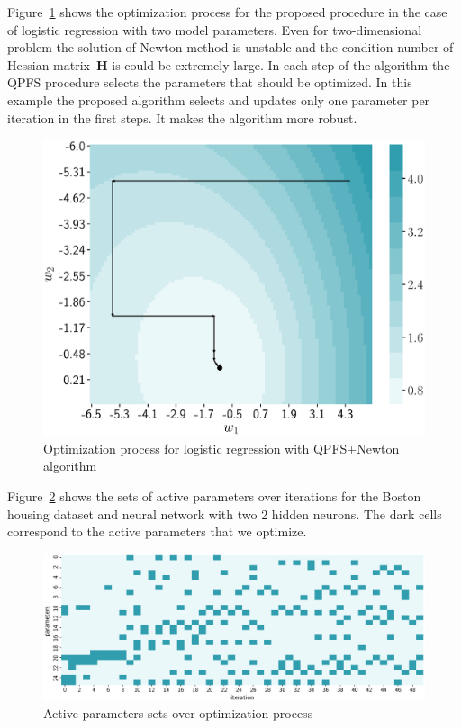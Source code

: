 \documentclass[a4paper,12pt]{article}
\theoremstyle{plain} %
\theoremstyle{definition} %
\theoremstyle{remark} %
\newcommand{\bH}{\mathbf{H}}
\begin{document}
Figure~\ref{fig:irls_qpfs_2d} shows the optimization process for the proposed procedure in the case of logistic regression with two model parameters. 
Even for two-dimensional problem the solution of Newton method is unstable and the condition number of Hessian matrix~$\bH$ is could be extremely large. 
In each step of the algorithm the QPFS procedure selects the parameters that should be optimized. 
In this example the proposed algorithm selects and updates only one parameter per iteration in the first steps. 
It makes the algorithm more robust.
\begin{figure}[!h]
	\centering
	\includegraphics[width=0.6\linewidth]{figs/irls_qpfs_2d.eps}	 
	\caption{Optimization process for logistic regression with QPFS+Newton algorithm}
	\label{fig:irls_qpfs_2d}
\end{figure}

Figure~\ref{fig:active_params_wrt_iters} shows the sets of active parameters over iterations for the Boston housing dataset and neural network with two 2 hidden neurons. 
The dark cells correspond to the active parameters that we optimize.

\begin{figure}[!h]
	\centering
	\includegraphics[width=\linewidth]{figs/active_params_wrt_iters.eps}	
	\caption{Active parameters sets over optimization process}
	\label{fig:active_params_wrt_iters}
\end{figure}
\end{document}
